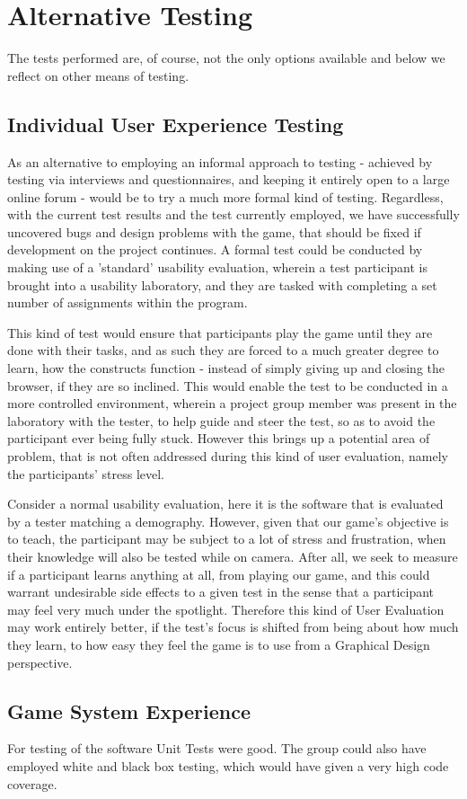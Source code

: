 \section{Alternative Testing}
The tests performed are, of course, not the only options available and below we reflect on other means of testing.

\subsection{Individual User Experience Testing}
As an alternative to employing an informal approach to testing - achieved by testing via interviews and questionnaires, and keeping it entirely open to a large online forum - would be to try a much more formal kind of testing. Regardless, with the current test results and the test currently employed, we have successfully uncovered bugs and design problems with the game, that should be fixed if development on the project continues. A formal test could be conducted by making use of a 'standard' usability evaluation, wherein a test participant is brought into a usability laboratory, and they are tasked with completing a set number of assignments within the program. 


This kind of test would ensure that participants play the game until they are done with their tasks, and as such they are forced to a much greater degree to learn, how the constructs function - instead of simply giving up and closing the browser, if they are so inclined. This would enable the test to be conducted in a more controlled environment, wherein a project group member was present in the laboratory with the tester, to help guide and steer the test, so as to avoid the participant ever being fully stuck. However this brings up a potential area of problem, that is not often addressed during this kind of user evaluation, namely the participants' stress level.


Consider a normal usability evaluation, here it is the software that is evaluated by a tester matching a demography. However, given that our game's objective is to teach, the participant may be subject to a lot of stress and frustration, when their knowledge will also be tested while on camera. After all, we seek to measure if a participant learns anything at all, from playing our game, and this could warrant undesirable side effects to a given test in the sense that a participant may feel very much under the spotlight. Therefore this kind of User Evaluation may work entirely better, if the test's focus is shifted from being about how much they learn, to how easy they feel the game is to use from a 
Graphical Design perspective.\newline


\subsection{Game System Experience} 
For testing of the software Unit Tests were good. The group could also have employed white and black box testing, which would have given a very high code coverage.